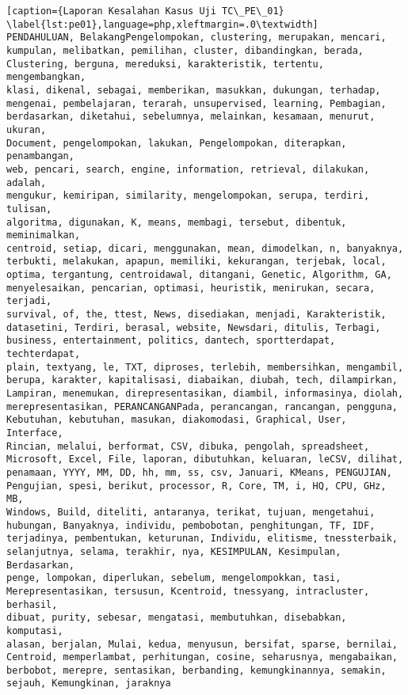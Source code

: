 \begin{enumerate}
\begin{lstlisting}[caption={Laporan Kesalahan Kasus Uji TC\_PE\_01}	\label{lst:pe01},language=php,xleftmargin=.0\textwidth]
PENDAHULUAN, BelakangPengelompokan, clustering, merupakan, mencari, 
kumpulan, melibatkan, pemilihan, cluster, dibandingkan, berada, 
Clustering, berguna, mereduksi, karakteristik, tertentu, mengembangkan, 
klasi, dikenal, sebagai, memberikan, masukkan, dukungan, terhadap, 
mengenai, pembelajaran, terarah, unsupervised, learning, Pembagian, 
berdasarkan, diketahui, sebelumnya, melainkan, kesamaan, menurut, ukuran, 
Document, pengelompokan, lakukan, Pengelompokan, diterapkan, penambangan, 
web, pencari, search, engine, information, retrieval, dilakukan, adalah, 
mengukur, kemiripan, similarity, mengelompokan, serupa, terdiri, tulisan, 
algoritma, digunakan, K, means, membagi, tersebut, dibentuk, meminimalkan, 
centroid, setiap, dicari, menggunakan, mean, dimodelkan, n, banyaknya, 
terbukti, melakukan, apapun, memiliki, kekurangan, terjebak, local, 
optima, tergantung, centroidawal, ditangani, Genetic, Algorithm, GA, 
menyelesaikan, pencarian, optimasi, heuristik, menirukan, secara, terjadi, 
survival, of, the, ttest, News, disediakan, menjadi, Karakteristik, 
datasetini, Terdiri, berasal, website, Newsdari, ditulis, Terbagi, 
business, entertainment, politics, dantech, sportterdapat, techterdapat, 
plain, textyang, le, TXT, diproses, terlebih, membersihkan, mengambil, 
berupa, karakter, kapitalisasi, diabaikan, diubah, tech, dilampirkan, 
Lampiran, menemukan, direpresentasikan, diambil, informasinya, diolah, 
merepresentasikan, PERANCANGANPada, perancangan, rancangan, pengguna, 
Kebutuhan, kebutuhan, masukan, diakomodasi, Graphical, User, Interface, 
Rincian, melalui, berformat, CSV, dibuka, pengolah, spreadsheet, 
Microsoft, Excel, File, laporan, dibutuhkan, keluaran, leCSV, dilihat, 
penamaan, YYYY, MM, DD, hh, mm, ss, csv, Januari, KMeans, PENGUJIAN, 
Pengujian, spesi, berikut, processor, R, Core, TM, i, HQ, CPU, GHz, MB, 
Windows, Build, diteliti, antaranya, terikat, tujuan, mengetahui, 
hubungan, Banyaknya, individu, pembobotan, penghitungan, TF, IDF, 
terjadinya, pembentukan, keturunan, Individu, elitisme, tnessterbaik, 
selanjutnya, selama, terakhir, nya, KESIMPULAN, Kesimpulan, Berdasarkan, 
penge, lompokan, diperlukan, sebelum, mengelompokkan, tasi, 
Merepresentasikan, tersusun, Kcentroid, tnessyang, intracluster, berhasil, 
dibuat, purity, sebesar, mengatasi, membutuhkan, disebabkan, komputasi, 
alasan, berjalan, Mulai, kedua, menyusun, bersifat, sparse, bernilai, 
Centroid, memperlambat, perhitungan, cosine, seharusnya, mengabaikan, 
berbobot, merepre, sentasikan, berbanding, kemungkinannya, semakin, 
sejauh, Kemungkinan, jaraknya


\end{lstlisting}
\end{enumerate}
